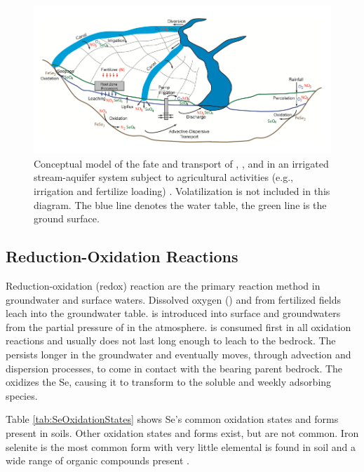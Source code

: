 \begin{linenumbers}[1]
\begin{figure}[!htbp]
	\centering
	\includegraphics[scale=1]{"Figures/fateAndTransport"}
	\caption[Conceptual model of the fate and transport of O2, NO3, and SeO4 in an irrigated stream-aquifer system subject to agricultural activities.]{Conceptual model of the fate and transport of \dox, \nitrate, and \sulfate in an irrigated stream-aquifer system subject to agricultural activities (e.g., irrigation and fertilize loading) \parencite{Bailey2012}.  Volatilization is not included in this diagram.  The blue line denotes the water table, the green line is the ground surface.}
	\label{fig:fateAndTransport}
\end{figure}

\subsection*{Reduction-Oxidation Reactions}
Reduction-oxidation (redox) reaction are the primary reaction method in groundwater and surface waters.  Dissolved oxygen (\dox) and \nitrate from fertilized fields leach into the groundwater table.   \dox is introduced into surface and groundwaters from the partial pressure of \dox in the atmosphere.  \dox is consumed first in all oxidation reactions and usually does not last long enough to leach to the bedrock.  The \nitrate persists longer in the groundwater and eventually moves, through advection and dispersion processes, to come in contact with the \Se bearing parent bedrock.  The \nitrate oxidizes the Se, causing it to transform to the soluble and weekly adsorbing \selenate species.

Table \ref{tab:SeOxidationStates} shows Se's common oxidation states and forms present in soils.  Other oxidation states and forms exist, but are not common.  Iron selenite is the most common form with very little elemental \Se is found in soil and a wide range of organic \Se compounds present \parencite{Painter1940}.


\end{linenumbers}
